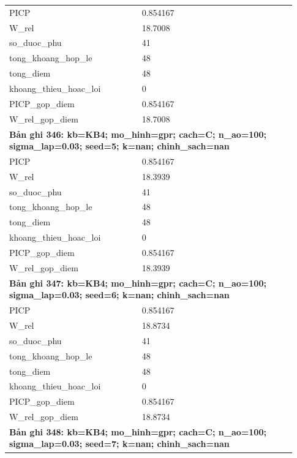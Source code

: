 \begin{longtable}{p{0.43\linewidth}p{0.50\linewidth}}
PICP & 0.854167 \\
W\_\allowbreak rel & 18.7008 \\
so\_\allowbreak duoc\_\allowbreak phu & 41 \\
tong\_\allowbreak khoang\_\allowbreak hop\_\allowbreak le & 48 \\
tong\_\allowbreak diem & 48 \\
khoang\_\allowbreak thieu\_\allowbreak hoac\_\allowbreak loi & 0 \\
PICP\_\allowbreak gop\_\allowbreak diem & 0.854167 \\
W\_\allowbreak rel\_\allowbreak gop\_\allowbreak diem & 18.7008 \\
\midrule
\multicolumn{2}{p{0.95\linewidth}}{\textbf{Bản ghi 346: kb=KB4; mo\_hinh=gpr; cach=C; n\_ao=100; sigma\_lap=0.03; seed=5; k=nan; chinh\_sach=nan}} \\
PICP & 0.854167 \\
W\_\allowbreak rel & 18.3939 \\
so\_\allowbreak duoc\_\allowbreak phu & 41 \\
tong\_\allowbreak khoang\_\allowbreak hop\_\allowbreak le & 48 \\
tong\_\allowbreak diem & 48 \\
khoang\_\allowbreak thieu\_\allowbreak hoac\_\allowbreak loi & 0 \\
PICP\_\allowbreak gop\_\allowbreak diem & 0.854167 \\
W\_\allowbreak rel\_\allowbreak gop\_\allowbreak diem & 18.3939 \\
\midrule
\multicolumn{2}{p{0.95\linewidth}}{\textbf{Bản ghi 347: kb=KB4; mo\_hinh=gpr; cach=C; n\_ao=100; sigma\_lap=0.03; seed=6; k=nan; chinh\_sach=nan}} \\
PICP & 0.854167 \\
W\_\allowbreak rel & 18.8734 \\
so\_\allowbreak duoc\_\allowbreak phu & 41 \\
tong\_\allowbreak khoang\_\allowbreak hop\_\allowbreak le & 48 \\
tong\_\allowbreak diem & 48 \\
khoang\_\allowbreak thieu\_\allowbreak hoac\_\allowbreak loi & 0 \\
PICP\_\allowbreak gop\_\allowbreak diem & 0.854167 \\
W\_\allowbreak rel\_\allowbreak gop\_\allowbreak diem & 18.8734 \\
\midrule
\multicolumn{2}{p{0.95\linewidth}}{\textbf{Bản ghi 348: kb=KB4; mo\_hinh=gpr; cach=C; n\_ao=100; sigma\_lap=0.03; seed=7; k=nan; chinh\_sach=nan}} \\

\end{longtable}
